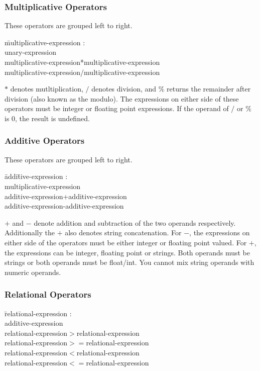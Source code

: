 \documentclass{article}
\begin{document}
\subsubsection{Multiplicative Operators}
These operators are grouped left to right.
\begin{itshape}
\begin{tabbing}
	\= multipl\=icative-expression : \\
		\>\> unary-expression \\		
		\>\> multiplicative-expression*multiplicative-expression \\
		\>\> multiplicative-expression/multiplicative-expression
\end{tabbing}
\end{itshape}

$*$ denotes mutltiplication, $/$ denotes division, and $\%$ returns the remainder after division (also known as the modulo). The expressions on either side of these operators must be integer or floating point expressions. If the operand of $/$ or $\%$ is 0, the result is undefined.

\subsubsection{Additive Operators}
These operators are grouped left to right.
\begin{itshape}
\begin{tabbing}
	\= addi\=tive-expression : \\
		\> \> multiplicative-expression \\
		\>\> additive-expression+additive-expression \\		
		\>\> additive-expression-additive-expression
\end{tabbing}
\end{itshape}

$+$ and $-$ denote addition and subtraction of the two operands respectively. Additionally the $+$ also denotes string concatenation. For $-$, the expressions on either side of the operators must be either integer or floating point valued. For $+$, the expressions can be integer, floating point or strings. Both operands must be strings or both operands must be float/int. You cannot mix string operands with numeric operands.

\subsubsection{Relational Operators}
\begin{itshape}
\begin{tabbing}
	\= relat\=ional-expression : \\
		\>\> additive-expression \\
		\>\> relational-expression$>$relational-expression \\		
		\>\> relational-expression$>=$relational-expression \\
		\>\> relational-expression$<$relational-expression \\
		\>\> relational-expression$<=$relational-expression 
\end{tabbing}
\end{itshape}
\end{document}
